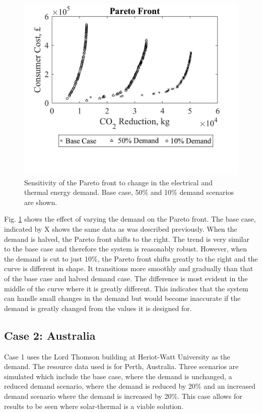 \begin{figure}[H]
	\centering
    \includegraphics[width=\columnwidth]{Figures/ParetoSens1.jpg}
    \vspace*{-15mm}
    \caption{Sensitivity of the Pareto front to change in the electrical and thermal energy demand. Base case, 50\% and 10\% demand scenarios are shown.}
    \label{fig:ParetoSens}
\end{figure}
  
Fig. \ref{fig:ParetoSens} shows the effect of varying the demand on the Pareto front. The base case, indicated by X shows the same data as was described previously. When the demand is halved, the Pareto front shifts to the right. The trend is very similar to the base case and therefore the system is reasonably robust. However, when the demand is cut to just 10\%, the Pareto front shifts greatly to the right and the curve is different in shape. It transitions more smoothly and gradually than that of the base case and halved demand case. The difference is most evident in the middle of the curve where it is greatly different. This indicates that the system can handle small changes in the demand but would become inaccurate if the demand is greatly changed from the values it is designed for.

\subsection{Case 2: Australia}

Case 1 uses the Lord Thomson building at Heriot-Watt University as the demand. The resource data used is for Perth, Australia. Three scenarios are simulated which include the base case, where the demand is unchanged, a reduced demand scenario, where the demand is reduced by 20\% and an increased demand scenario where the demand is increased by 20\%.  This case allows for results to be seen where solar-thermal is a viable solution.


